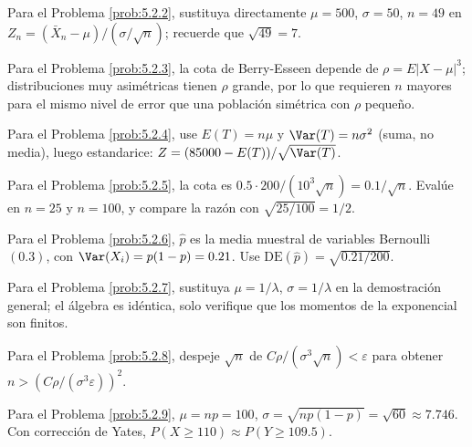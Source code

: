 \begin{sugerencia}
	\label{sug:5.2.2}
	Para el Problema \ref{prob:5.2.2}, sustituya directamente $\mu=500$, $\sigma=50$, $n=49$ en $Z_n=(\bar X_n-\mu)/(\sigma/\sqrt n)$; recuerde que $\sqrt{49}=7$.
\end{sugerencia}

\begin{sugerencia}
	\label{sug:5.2.3}
	Para el Problema \ref{prob:5.2.3}, la cota de Berry-Esseen depende de $\rho=E|X-\mu|^3$; distribuciones muy asimétricas tienen $\rho$ grande, por lo que requieren $n$ mayores para el mismo nivel de error que una población simétrica con $\rho$ pequeño.
\end{sugerencia}

\begin{sugerencia}
	\label{sug:5.2.4}
	Para el Problema \ref{prob:5.2.4}, use $E(T)=n\mu$ y $\Var(T)=n\sigma^2$ (suma, no media), luego estandarice: $Z=(85000-E(T))/\sqrt{\Var(T)}$.
\end{sugerencia}

\begin{sugerencia}
	\label{sug:5.2.5}
	Para el Problema \ref{prob:5.2.5}, la cota es $0.5\cdot 200/(10^3\sqrt n) = 0.1/\sqrt n$. Evalúe en $n=25$ y $n=100$, y compare la razón con $\sqrt{25/100}=1/2$.
\end{sugerencia}

\begin{sugerencia}
	\label{sug:5.2.6}
	Para el Problema \ref{prob:5.2.6}, $\hat p$ es la media muestral de variables Bernoulli$(0.3)$, con $\Var(X_i)=p(1-p)=0.21$. Use $\text{DE}(\hat p)=\sqrt{0.21/200}$.
\end{sugerencia}

\begin{sugerencia}
	\label{sug:5.2.7}
	Para el Problema \ref{prob:5.2.7}, sustituya $\mu=1/\lambda$, $\sigma=1/\lambda$ en la demostración general; el álgebra es idéntica, solo verifique que los momentos de la exponencial son finitos.
\end{sugerencia}

\begin{sugerencia}
	\label{sug:5.2.8}
	Para el Problema \ref{prob:5.2.8}, despeje $\sqrt n$ de $C\rho/(\sigma^3\sqrt n) < \varepsilon$ para obtener $n > (C\rho/(\sigma^3\varepsilon))^2$.
\end{sugerencia}

\begin{sugerencia}
	\label{sug:5.2.9}
	Para el Problema \ref{prob:5.2.9}, $\mu=np=100$, $\sigma=\sqrt{np(1-p)}=\sqrt{60}\approx 7.746$. Con corrección de Yates, $P(X\ge 110)\approx P(Y\ge 109.5)$.
\end{sugerencia}

